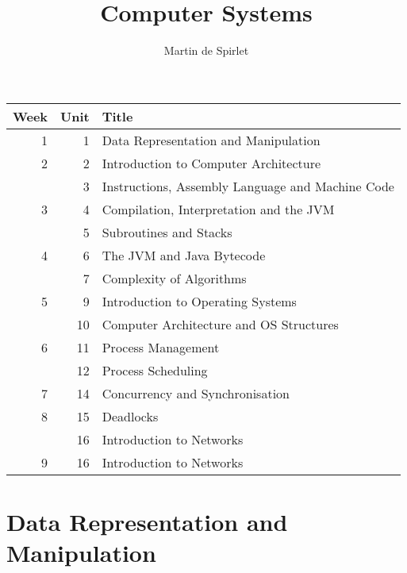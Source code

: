 \documentclass[
  11pt,
  a4paper,
]{article}
\title{Computer Systems}
\author{Martin de Spirlet}
\date{}
\begin{document}

\maketitle

\vspace*{\fill}

\begin{table}[htp]
  \centering
  \begin{tabular}{rrl}
    \toprule
    Week & Unit & Title \\
    \midrule
     1 &  1 & Data Representation and Manipulation \\[1ex]
     2 &  2 & Introduction to Computer Architecture \\
       &  3 & Instructions, Assembly Language and Machine Code \\[1ex]
     3 &  4 & Compilation, Interpretation and the JVM \\
       &  5 & Subroutines and Stacks \\[1ex]
     4 &  6 & The JVM and Java Bytecode \\
       &  7 & Complexity of Algorithms \\[1ex]
     5 &  9 & Introduction to Operating Systems \\
       & 10 & Computer Architecture and OS Structures \\[1ex]
     6 & 11 & Process Management \\
       & 12 & Process Scheduling \\[1ex]
     7 & 14 & Concurrency and Synchronisation \\[1ex]
     8 & 15 & Deadlocks \\
       & 16 & Introduction to Networks \\[1ex]
     9 & 16 & Introduction to Networks \\
    \bottomrule
  \end{tabular}
\end{table}

\vspace*{\fill}
\addvspace{1in}

\clearpage


\section{Data Representation and Manipulation}

\end{document}
